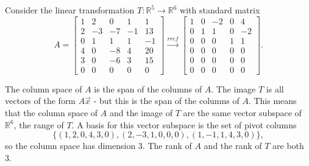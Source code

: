 \begin{example}
Consider the linear transformation $T:{\mathbb{R}}^5\to {\mathbb{R}}^6$ with standard matrix 
$$A=\begin{bmatrix}
 1 & 2 & 0 & 1 & 1 \\
 2 & -3 & -7 & -1 & 13 \\
 0 & 1 & 1 & 1 & -1 \\
 4 & 0 & -8 & 4 & 20 \\
 3 & 0 & -6 & 3 & 15 \\
 0 & 0 & 0 & 0 & 0
 \end{bmatrix} 
\xrightarrow{rref}
\begin{bmatrix}
 1 & 0 & -2 & 0 & 4 \\
 0 & 1 & 1 & 0 & -2 \\
 0 & 0 & 0 & 1 & 1 \\
 0 & 0 & 0 & 0 & 0 \\
 0 & 0 & 0 & 0 & 0 \\
 0 & 0 & 0 & 0 & 0
\end{bmatrix}.$$

The column space of $A$ is the span of the columns of $A$. 
The image $T$ is all vectors of the form $A\vec x$ - but this is the span of the columns of $A$. 
This means that the column space of $A$ and the image of $T$ are the same vector subspace of ${\mathbb{R}}^6$, the range of $T$. 
A basis for this vector subspace is the set of pivot columns $$\{(1, 2, 0, 4, 3, 0), (2, -3, 1, 0, 0, 0), (1, -1, 1, 4, 3, 0)\},$$ so the column space has dimension 3. The rank of $A$ and the rank of $T$ are both 3.


\end{example}
